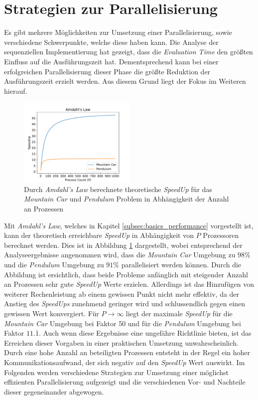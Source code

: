 \section{Strategien zur Parallelisierung}
Es gibt mehrere Möglichkeiten zur Umsetzung einer Parallelisierung, sowie verschiedene Schwerpunkte, welche diese haben kann. Die Analyse der sequenziellen Implementierung hat gezeigt, dass die \emph{Evaluation Time} den größten Einfluss auf die Ausführungszeit hat.  Dementsprechend kann bei einer erfolgreichen Parallelisierung dieser Phase die größte Reduktion der Ausführungszeit erzielt werden. Aus diesem Grund liegt der Fokus im Weiteren hierauf. 
\begin{figure}[!h]
	\centering
	\includegraphics[width=0.5\textwidth]{./img/ahmdals_law_mountain_pendulum.pdf} 
	\caption{Durch \emph{Amdahl's Law} berechnete theoretische \emph{SpeedUp} für das \emph{Mountain Car} und \emph{Pendulum} Problem in Abhängigkeit der Anzahl an Prozessen}
	\label{fig:amdahls_law_mountain_pendulum}
\end{figure}
Mit \emph{Amdahl's Law}, welches in Kapitel \ref{subsec:basics_performance} vorgestellt ist, kann der theoretisch erreichbare \emph{SpeedUp} in Abhängigkeit von $P$ Prozessoren berechnet werden. Dies ist in Abbildung \ref{fig:amdahls_law_mountain_pendulum} dargestellt, wobei entsprechend der Analyseergebnisse angenommen wird, dass die \emph{Mountain Car} Umgebung zu $98\%$ und die \emph{Pendulum} Umgebung zu $91\%$ parallelisiert werden können. Durch die Abbildung ist ersichtlich, dass beide Probleme anfänglich mit steigender Anzahl an Prozessen sehr gute \emph{SpeedUp} Werte erzielen. Allerdings ist das Hinzufügen von weiterer Rechenleistung ab einem gewissen Punkt nicht mehr effektiv, da der Anstieg des \emph{SpeedUps} zunehmend geringer wird und schlussendlich gegen einen gewissen Wert konvergiert. Für $P \rightarrow \infty$ liegt der maximale \emph{SpeedUp} für die \emph{Mountain Car} Umgebung bei Faktor 50 und für die \emph{Pendulum} Umgebung bei Faktor $11.\overline{1}$. Auch wenn diese Ergebnisse eine ungefähre Richtlinie bieten, ist das Erreichen dieser Vorgaben in einer praktischen Umsetzung unwahrscheinlich. Durch eine hohe Anzahl an beteiligten Prozessen entsteht in der Regel ein hoher Kommunikationsaufwand, der sich negativ auf den \emph{SpeedUp} Wert auswirkt. Im Folgenden werden verschiedene Strategien zur Umsetzung einer möglichst effizienten Parallelisierung aufgezeigt und die verschiedenen Vor- und Nachteile dieser gegeneinander abgewogen.
